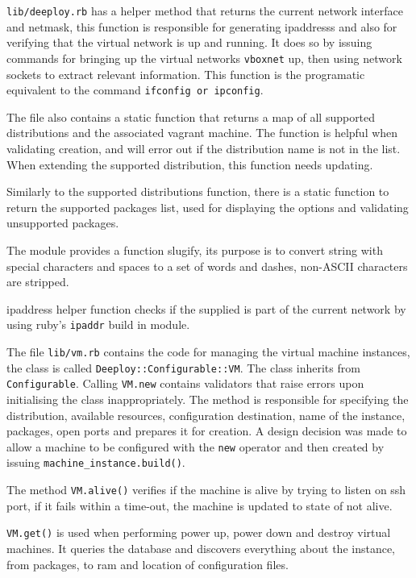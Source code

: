 \documentclass{article}
\begin{document}
\texttt{lib/deeploy.rb} has a helper method that returns the current network interface and \gls{netmask}, this function is responsible for generating \glspl{ipaddress} and also for verifying that the virtual network is up and running. It does so by issuing commands for bringing up the virtual networks \texttt{vboxnet} up, then using network sockets to extract relevant information. This function is the programatic equivalent to the command \texttt{ifconfig or ipconfig}.

The file also contains a static function that returns a map of all supported distributions and the associated \gls{vagrant} machine. The function is helpful when validating creation, and will error out if the \gls{distribution} name is not in the list. When extending the supported distribution, this function needs updating.

Similarly to the supported \glspl{distribution} function, there is a static function to return the supported packages list, used for displaying the options and validating unsupported packages.

The module provides a function slugify, its purpose is to convert string with special characters and spaces to a set of words and dashes, non-ASCII characters are stripped.

\gls{ipaddress} helper function checks if the supplied  is part of the current network by using ruby's \texttt{ipaddr} build in module.

The file \texttt{lib/vm.rb} contains the code for managing the virtual machine instances, the class is called \texttt{Deeploy::Configurable::VM}. The class inherits from \texttt{Configurable}. Calling \texttt{VM.new} contains validators that raise errors upon initialising the class inappropriately.
The method is responsible for specifying the distribution, available resources, configuration destination, name of the instance, packages, open ports and prepares it for creation. A design decision was made to allow a machine to be configured with the \texttt{new} operator and then created by issuing \texttt{machine\_instance.build()}.

The method \texttt{VM.alive()} verifies if the machine is alive by trying to listen on \gls{ssh} port, if it fails within a time-out, the machine is updated to state of not alive.

\texttt{VM.get()} is used when performing power up, power down and destroy virtual machines. It queries the database and discovers everything about the instance, from packages, to \gls{ram} and location of configuration files.
\end{document}
